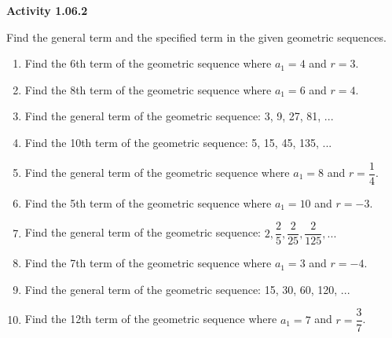 \vspace{0.3ex}
\noindent\textbf{Activity 1.06.2}

\vspace{0.2ex}

Find the general term and the specified term in the given geometric sequences.
\begin{enumerate}
    \item Find the 6th term of the geometric sequence where \( a_1 = 4 \) and \( r = 3 \).
    \item Find the 8th term of the geometric sequence where \( a_1 = 6 \) and \( r = 4 \).
    \item Find the general term of the geometric sequence: 3, 9, 27, 81, ...
    \item Find the 10th term of the geometric sequence: 5, 15, 45, 135, ...
    \item Find the general term of the geometric sequence where \( a_1 = 8 \) and \( r = \dfrac{1}{4} \).
    \item Find the 5th term of the geometric sequence where \( a_1 = 10 \) and \( r = -3 \).
    \item Find the general term of the geometric sequence: \(2, \dfrac{2}{5}, \dfrac{2}{25}, \dfrac{2}{125}, ...\)
    \item Find the 7th term of the geometric sequence where \( a_1 = 3 \) and \( r = -4 \).
    \item Find the general term of the geometric sequence: 15, 30, 60, 120, ...
    \item Find the 12th term of the geometric sequence where \( a_1 = 7 \) and \( r = \dfrac{3}{7} \).
\end{enumerate}
